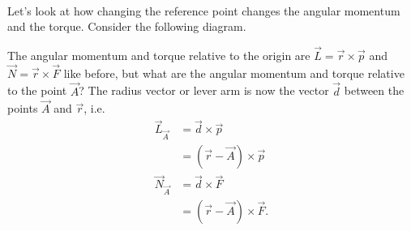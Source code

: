 \documentclass[../classical_mechanics.tex]{subfiles}
\begin{document}
        \paragraph{}
        Let's look at how changing the reference point changes the angular momentum and the torque.
        Consider the following diagram.
        \begin{figure}[H]
            \centering
        \end{figure}
        The angular momentum and torque relative to the origin are $\vec{L}=\vec{r}\times\vec{p}$ and $\vec{N}=\vec{r}\times\vec{F}$ like before, but what are the angular momentum and torque relative to the point $\vec{A}$?
        The radius vector or lever arm is now the vector $\vec{d}$ between the points $\vec{A}$ and $\vec{r}$, i.e.
        \begin{align}
            \vec{L}_{\vec{A}}&=\vec{d}\times\vec{p}\\
            &=(\vec{r}-\vec{A})\times\vec{p}\\
            \vec{N}_{\vec{A}}&=\vec{d}\times\vec{F}\\
            &=(\vec{r}-\vec{A})\times\vec{F}.
        \end{align}
\end{document}
